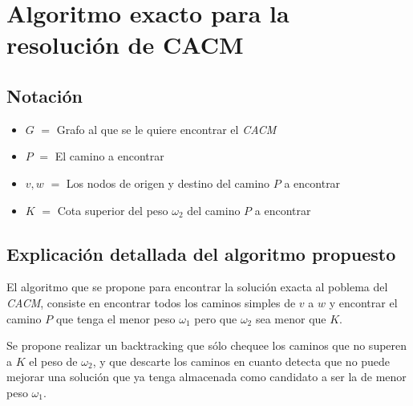 \section{Algoritmo exacto para la resoluci\'on de CACM}

\subsection{Notaci\'on} \label{exacto:notacion}

\begin{itemize}
	\item $G$ $=$ Grafo al que se le quiere encontrar el \emph{CACM}
	\item $P$ $=$ El camino a encontrar
	\item $v, w$ $=$ Los nodos de origen y destino del camino $P$ a encontrar
	\item $K$ $=$ Cota superior del peso $\omega_2$ del camino $P$ a encontrar
\end{itemize}

\subsection{Explicaci\'on detallada del algoritmo propuesto} \label{exacto:explicacion}

El algoritmo que se propone para encontrar la soluci\'on exacta al poblema del \emph{CACM}, consiste en encontrar todos los caminos simples de $v$ a $w$
y encontrar el camino $P$ que tenga el menor peso $\omega_1$ pero que $\omega_2$ sea menor que $K$.

Se propone realizar un backtracking que s\'olo chequee los caminos que no superen a $K$ el peso de $\omega_2$, y que descarte los caminos en cuanto
detecta que no puede mejorar una soluci\'on que ya tenga almacenada como candidato a ser la de menor peso $\omega_1$.

